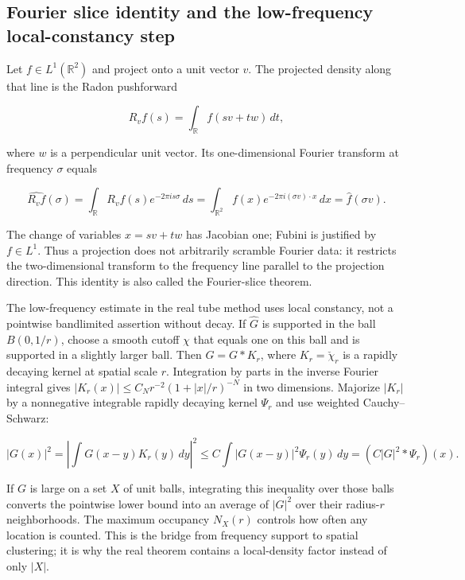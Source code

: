 \subsection{Fourier slice identity and the low-frequency local-constancy step}\label{04-visual-computing-ii-ch032-fourier-slice-identity-and-the-low-frequency-local-constancy-step}

\hypertarget{04-visual-computing-ii-ch032-fourier-slice-identity-and-the-low-frequency-local-constancy-step}{}

Let \(f\in L^1(\mathbb R^2)\) and project onto a unit vector \(v\). The projected density along that line is the Radon pushforward

\[R_vf(s)=\int_{\mathbb R}f(sv+tw)\,dt,\]

where \(w\) is a perpendicular unit vector. Its one-dimensional Fourier transform at frequency \(\sigma\) equals

\[\widehat{R_vf}(\sigma)=\int_{\mathbb R}R_vf(s)e^{-2\pi i s\sigma}\,ds=\int_{\mathbb R^2}f(x)e^{-2\pi i (\sigma v)\cdot x}\,dx=\widehat f(\sigma v).\]

The change of variables \(x=sv+tw\) has Jacobian one; Fubini is justified by \(f\in L^1\). Thus a projection does not arbitrarily scramble Fourier data: it restricts the two-dimensional transform to the frequency line parallel to the projection direction. This identity is also called the Fourier-slice theorem.

The low-frequency estimate in the real tube method uses local constancy, not a pointwise bandlimited assertion without decay. If \(\widehat G\) is supported in the ball \(B(0,1/r)\), choose a smooth cutoff \(\chi\) that equals one on this ball and is supported in a slightly larger ball. Then \(G=G*K_r\), where \(K_r=\check\chi_r\) is a rapidly decaying kernel at spatial scale \(r\). Integration by parts in the inverse Fourier integral gives \(|K_r(x)|\le C_Nr^{-2}(1+|x|/r)^{-N}\) in two dimensions. Majorize \(|K_r|\) by a nonnegative integrable rapidly decaying kernel \(\Psi_r\) and use weighted Cauchy--Schwarz:

\[|G(x)|^2=\left|\int G(x-y)K_r(y)\,dy\right|^2\le C\int |G(x-y)|^2\Psi_r(y)\,dy=(C|G|^2*\Psi_r)(x).\]

If \(G\) is large on a set \(X\) of unit balls, integrating this inequality over those balls converts the pointwise lower bound into an average of \(|G|^2\) over their radius-\(r\) neighborhoods. The maximum occupancy \(N_X(r)\) controls how often any location is counted. This is the bridge from frequency support to spatial clustering; it is why the real theorem contains a local-density factor instead of only \(|X|\).

